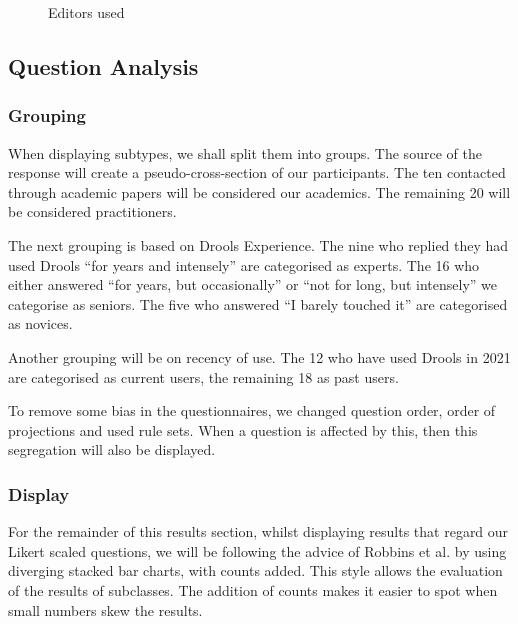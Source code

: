 \begin{figure}[h]
    \centering
    \caption{Editors used}
    \label{fig:editorUsage}
\end{figure}

\subsection{Question Analysis}

\subsubsection{Grouping}
When displaying subtypes, we shall split them into groups.
The source of the response will create a pseudo-cross-section of our participants.
The ten contacted through academic papers will be considered our academics.
The remaining 20 will be considered practitioners.

The next grouping is based on Drools Experience.
The nine who replied they had used Drools ``for years and intensely'' are categorised as experts.
The 16 who either answered ``for years, but occasionally'' or ``not for long, but intensely'' we categorise as seniors.
The five who answered ``I barely touched it'' are categorised as novices.

Another grouping will be on recency of use.
The 12 who have used Drools in 2021 are categorised as current users, the remaining 18 as past users.

To remove some bias in the questionnaires, we changed question order, order of projections and used rule sets.
When a question is affected by this, then this segregation will also be displayed.

\subsubsection{Display}
For the remainder of this results section, whilst displaying results that regard our Likert scaled questions, we will be following the advice of Robbins et al.\cite{robbins2011plotting} by using diverging stacked bar charts, with counts added.
This style allows the evaluation of the results of subclasses.
The addition of counts makes it easier to spot when small numbers skew the results.

